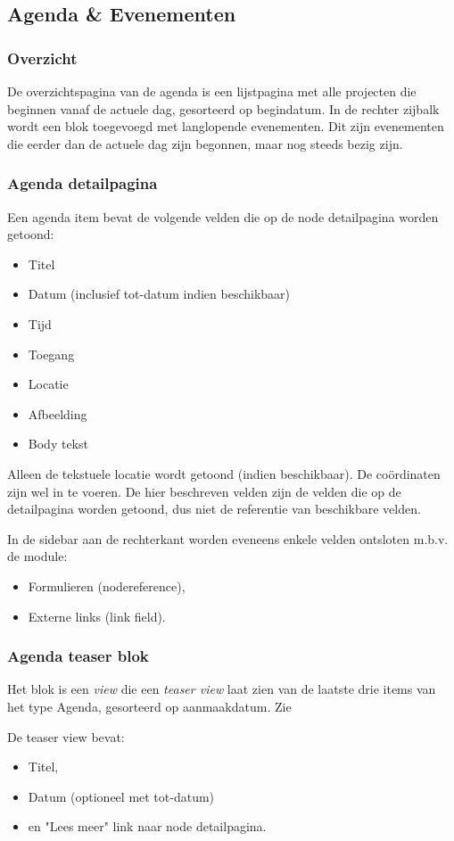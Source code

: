 \subsection{Agenda \& Evenementen}\label{agenda-en-evenementen}

\subsubsection{Overzicht}\label{agendaoverzicht}

De overzichtspagina van de agenda is een lijstpagina met alle projecten die beginnen vanaf de actuele dag, gesorteerd op begindatum. In de rechter zijbalk wordt een blok toegevoegd met langlopende evenementen. Dit zijn evenementen die eerder dan de actuele dag zijn begonnen, maar nog steeds bezig zijn.

\subsubsection{Agenda detailpagina}\label{agenda-detail}

Een agenda item bevat de volgende velden die op de node detailpagina worden getoond:
\begin{itemize}
\item Titel
\item Datum (inclusief tot-datum indien beschikbaar)
\item Tijd
\item Toegang
\item Locatie
\item Afbeelding
\item Body tekst
\end{itemize}
Alleen de tekstuele locatie wordt getoond (indien beschikbaar). De co\"{o}rdinaten zijn wel in te voeren. De hier beschreven velden zijn de velden die op de detailpagina worden getoond, dus niet de referentie van beschikbare velden.

In de sidebar aan de rechterkant worden eveneens enkele velden ontsloten m.b.v. de  module:
\begin{itemize}
\item Formulieren (nodereference),
\item Externe links (link field).
\end{itemize}

\subsubsection{Agenda teaser blok}

Het blok is een \emph{view} die een \emph{teaser view} laat zien van de laatste drie items van het type Agenda, gesorteerd op aanmaakdatum. Zie 

De teaser view bevat:
\begin{itemize}
\item Titel,
\item Datum (optioneel met tot-datum)
\item en "Lees meer" link naar node detailpagina.
\end{itemize}